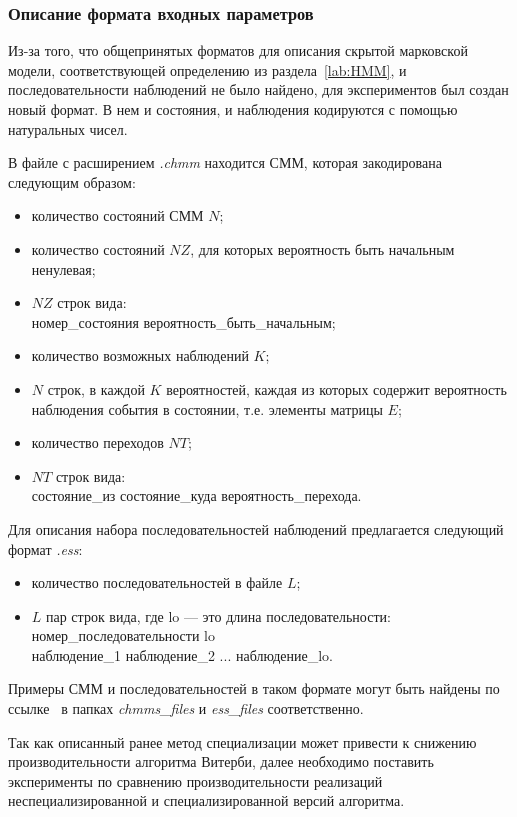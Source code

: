 \subsubsection{Описание формата входных параметров}
\label{lab:formats}
Из-за того, что общепринятых форматов для описания скрытой 
марковской модели, соответствующей определению из 
раздела~\ref{lab:HMM}, и последовательности наблюдений не 
было найдено, для экспериментов был создан новый формат.
В нем и состояния, и наблюдения кодируются с помощью 
натуральных чисел.

В файле с расширением \emph{.chmm} находится СММ, которая закодирована следующим образом:
\begin{itemize}
	\item количество состояний СММ $N$;
	\item количество состояний $NZ$, для которых вероятность быть начальным ненулевая;
	\item $NZ$ строк вида:\\ 
	номер\_состояния вероятность\_быть\_начальным;
	\item количество возможных наблюдений $K$;
	\item $N$ строк, в каждой $K$ вероятностей, каждая из которых содержит вероятность наблюдения события в состоянии, т.е. элементы матрицы $E$;
	\item количество переходов $NT$;
	\item $NT$ строк вида:\\ состояние\_из состояние\_куда вероятность\_перехода.
\end{itemize}

Для описания набора последовательностей наблюдений 
предлагается следующий формат \emph{.ess}:
\begin{itemize}
	\item количество последовательностей в файле $L$;
	\item $L$ пар строк вида, где lo --- это длина последовательности:\\
	номер\_последовательности lo\\
	наблюдение\_1 наблюдение\_2 ... наблюдение\_lo.
\end{itemize}

Примеры СММ и последовательностей в таком формате могут быть 
найдены по ссылке~\cite{repo} в папках \emph{chmms\_files} и 
\emph{ess\_files} соответственно.

Так как описанный ранее метод специализации может привести 
к снижению производительности алгоритма Витерби, далее 
необходимо поставить эксперименты по сравнению 
производительности реализаций неспециализированной и 
специализированной версий алгоритма.

